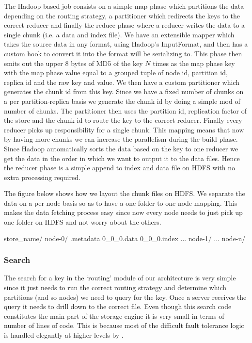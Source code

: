 \documentclass[10pt,twocolumn,preprint,nonatbib,numbers]{sigplanconf}
\begin{document}
The Hadoop based job consists on a simple map phase which partitions the data depending on the routing strategy, a partitioner which redirects the keys to the correct reducer and finally the reduce phase where a reducer writes the data to a single chunk (i.e. a data and index file). We have an extensible mapper which takes the source data in any format, using Hadoop's InputFormat, and then has a custom hook to convert it into the format \projectname{} will be serializing to. This phase then emits out the upper 8 bytes of MD5 of the \projectname{} key $N$ times as the map phase key with the map phase value equal to a grouped tuple of node id, partition id, replica id and the raw \projectname{} key and value. We then have a custom partitioner which generates the chunk id from this key. Since we have a fixed number of chunks on a per partition-replica basis we generate the chunk id by doing a simple mod of number of chunks. The partitioner then uses the partition id, replication factor of the store and the chunk id to route the key to the correct reducer. Finally every reducer picks up responsibility for a single chunk. This mapping means that now by having more chunks we can increase the parallelism during the build phase. Since Hadoop automatically sorts the data based on the key to one reducer we get the data in the order in which we want to output it to the data files. Hence the reducer phase is a simple append to index and data file on HDFS with no extra processing required.  

The figure below shows how we layout the chunk files on HDFS. We separate the data on a per node basis so as to have a one folder to one node mapping. This makes the data fetching process easy since now every node needs to just pick up one folder on HDFS and not worry about the others.

\scriptsize
\begin{verbatimtab}
store_name/
  node-0/
    .metadata
    0_0_0.data
    0_0_0.index
    ...
  node-1/
  ...
  node-n/
\end{verbatimtab}
\normalsize


\subsubsection{Search}
\label{sec:read_only:search}

The search for a key in the `routing' module of our architecture is very simple since it just needs to run the correct routing strategy and determine which partitions (and so nodes) we need to query for the key. Once a server receives the query it needs to drill down to the correct file. Even though this search code constitutes the main part of the storage engine it is very small in terms of number of lines of code. This is because most of the difficult fault tolerance logic is handled elegantly at higher levels by \projectname{}.
\end{document}
